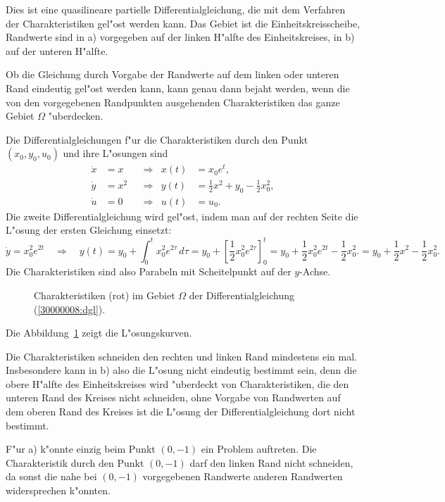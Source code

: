 \begin{loesung}
Dies ist eine quasilineare partielle Differentialgleichung, die mit dem
Verfahren der Charakteristiken gel"ost werden kann.
Das Gebiet ist die Einheitskreisscheibe, Randwerte sind in a) vorgegeben
auf der linken H"alfte des Einheitskreises, in b) auf der unteren H"alfte.

Ob die Gleichung durch Vorgabe der Randwerte auf dem linken oder unteren Rand
eindeutig gel"ost werden kann, kann genau dann bejaht werden, wenn die 
von den vorgegebenen Randpunkten
ausgehenden Charakteristiken das ganze Gebiet $\Omega$ "uberdecken.

Die Differentialgleichungen f"ur die Charakteristiken durch den Punkt
$(x_0,y_0,u_0)$ und ihre L"osungen sind
\begin{align*}
\dot x&=x&&\Rightarrow&x(t)&=x_0e^t,\\
\dot y&=x^2&&\Rightarrow&y(t)&=\frac12x^2+y_0-\frac12x_0^2,\\
\dot u&=0&&\Rightarrow&u(t)&=u_0.
\end{align*}
Die zweite Differentialgleichung wird gel"ost, indem man auf der rechten
Seite die L"osung der ersten Gleichung einsetzt:
\[
\dot y=x_0^2e^{2t}
\quad\Rightarrow\quad
y(t)
=y_0 + \int_0^tx_0^2e^{2\tau}\,d\tau
=y_0 + \left[\frac12x_0^2e^{2\tau}\right]_0^t
=y_0 + \frac12x_0^2e^{2t}-\frac12x_0^2.
=y_0 + \frac12x^2-\frac12x_0^2.
\]
Die Charakteristiken sind also Parabeln mit Scheitelpunkt auf der
$y$-Achse.
\begin{figure}
\begin{center}
\end{center}
\caption{Charakteristiken (rot) im Gebiet $\Omega$ der Differentialgleichung
(\ref{30000008:dgl}).\label{30000008:domain}}
\end{figure}
Die Abbildung~\ref{30000008:domain} zeigt die L"osungskurven.

Die Charakteristiken schneiden den rechten und linken Rand mindestens ein mal.
Insbesondere kann in b) also die L"osung nicht eindeutig bestimmt sein, denn
die obere H"alfte des Einheitskreises wird "uberdeckt von
Charakteristiken, die den unteren Rand des Kreises nicht schneiden,
ohne Vorgabe von Randwerten auf dem oberen Rand des Kreises ist die
L"osung der Differentialgleichung dort nicht bestimmt.

F"ur a) k"onnte einzig beim Punkt $(0,-1)$ ein Problem auftreten.
Die Charakteristik durch den
Punkt $(0,-1)$ darf den linken Rand nicht schneiden, da sonst die 
nahe bei $(0,-1)$ vorgegebenen Randwerte anderen Randwerten widersprechen
k"onnten.


\end{loesung}
